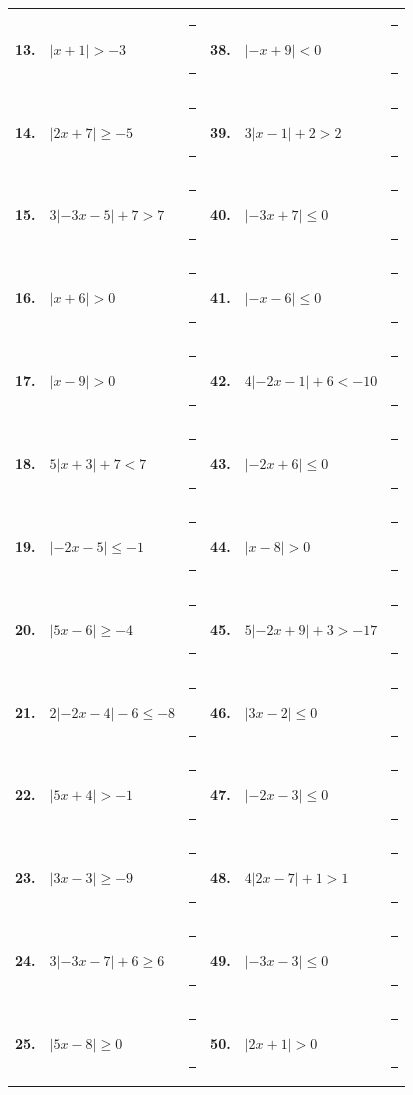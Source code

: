 \documentclass[10pt]{article}
\begin{document}
{\begin{tabular}{@{}r@{\ \ }p{4.1cm}p{4.0cm}@{\qquad}r@{\ \ }p{4.1cm}p{4.0cm}@{}}
\textbf{13.} & $\left|x+1\right|>-3$ & \rule{0.6cm}{0.4pt}\ \rule{2.8cm}{0.4pt} & \textbf{38.} & $\left|-x+9\right|<0$ & \rule{0.6cm}{0.4pt}\ \rule{2.8cm}{0.4pt}\\
\textbf{14.} & $\left|2x+7\right|\ge-5$ & \rule{0.6cm}{0.4pt}\ \rule{2.8cm}{0.4pt} & \textbf{39.} & $3\left|x-1\right|+2>2$ & \rule{0.6cm}{0.4pt}\ \rule{2.8cm}{0.4pt}\\
\textbf{15.} & $3\left|-3x-5\right|+7>7$ & \rule{0.6cm}{0.4pt}\ \rule{2.8cm}{0.4pt} & \textbf{40.} & $\left|-3x+7\right|\le0$ & \rule{0.6cm}{0.4pt}\ \rule{2.8cm}{0.4pt}\\
\textbf{16.} & $\left|x+6\right|>0$ & \rule{0.6cm}{0.4pt}\ \rule{2.8cm}{0.4pt} & \textbf{41.} & $\left|-x-6\right|\le0$ & \rule{0.6cm}{0.4pt}\ \rule{2.8cm}{0.4pt}\\
\textbf{17.} & $\left|x-9\right|>0$ & \rule{0.6cm}{0.4pt}\ \rule{2.8cm}{0.4pt} & \textbf{42.} & $4\left|-2x-1\right|+6<-10$ & \rule{0.6cm}{0.4pt}\ \rule{2.8cm}{0.4pt}\\
\textbf{18.} & $5\left|x+3\right|+7<7$ & \rule{0.6cm}{0.4pt}\ \rule{2.8cm}{0.4pt} & \textbf{43.} & $\left|-2x+6\right|\le0$ & \rule{0.6cm}{0.4pt}\ \rule{2.8cm}{0.4pt}\\
\textbf{19.} & $\left|-2x-5\right|\le-1$ & \rule{0.6cm}{0.4pt}\ \rule{2.8cm}{0.4pt} & \textbf{44.} & $\left|x-8\right|>0$ & \rule{0.6cm}{0.4pt}\ \rule{2.8cm}{0.4pt}\\
\textbf{20.} & $\left|5x-6\right|\ge-4$ & \rule{0.6cm}{0.4pt}\ \rule{2.8cm}{0.4pt} & \textbf{45.} & $5\left|-2x+9\right|+3>-17$ & \rule{0.6cm}{0.4pt}\ \rule{2.8cm}{0.4pt}\\
\textbf{21.} & $2\left|-2x-4\right|-6\le-8$ & \rule{0.6cm}{0.4pt}\ \rule{2.8cm}{0.4pt} & \textbf{46.} & $\left|3x-2\right|\le0$ & \rule{0.6cm}{0.4pt}\ \rule{2.8cm}{0.4pt}\\
\textbf{22.} & $\left|5x+4\right|>-1$ & \rule{0.6cm}{0.4pt}\ \rule{2.8cm}{0.4pt} & \textbf{47.} & $\left|-2x-3\right|\le0$ & \rule{0.6cm}{0.4pt}\ \rule{2.8cm}{0.4pt}\\
\textbf{23.} & $\left|3x-3\right|\ge-9$ & \rule{0.6cm}{0.4pt}\ \rule{2.8cm}{0.4pt} & \textbf{48.} & $4\left|2x-7\right|+1>1$ & \rule{0.6cm}{0.4pt}\ \rule{2.8cm}{0.4pt}\\
\textbf{24.} & $3\left|-3x-7\right|+6\ge6$ & \rule{0.6cm}{0.4pt}\ \rule{2.8cm}{0.4pt} & \textbf{49.} & $\left|-3x-3\right|\le0$ & \rule{0.6cm}{0.4pt}\ \rule{2.8cm}{0.4pt}\\
\textbf{25.} & $\left|5x-8\right|\ge0$ & \rule{0.6cm}{0.4pt}\ \rule{2.8cm}{0.4pt} & \textbf{50.} & $\left|2x+1\right|>0$ & \rule{0.6cm}{0.4pt}\ \rule{2.8cm}{0.4pt}\\
\end{tabular}}
\end{document}
